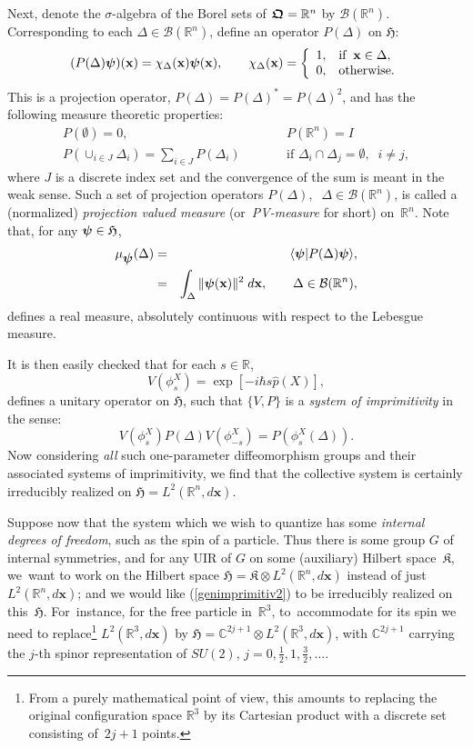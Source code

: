 \documentclass[11pt]{amsart}
\numberwithin{equation}{section}
\theoremstyle{remark}
\newcommand\HH{\mathfrak H}
\newcommand\RR{\mathbb R}
\newcommand{\be}{\begin{equation}}
\newcommand{\en}{\end{equation}}
\newcommand{\bea}{\begin{eqnarray}}
\newcommand{\ena}{\end{eqnarray}}
\newcommand{\CC}{\C}
\newcommand{\bpsi}{\mbox{\boldmath $\psi$}}
\newcommand{\bfrakQ}{\mbox{\boldmath $\mathfrak Q$}}
\newcommand{\bx}{\mathbf x}
\newcommand{\C}{\mathbb C}
\begin{document}
Next, denote the $\sigma$-algebra of the Borel sets of
$\bfrakQ = {\mathbb R}^n$ by ${\mathcal B}({\mathbb R}^n)$. Corresponding
to each $\Delta \in {\mathcal B}({\mathbb R}^n)$, define an operator
$P(\Delta )$ on $\HH$:
\be
  (P(\Delta )\bpsi )(\bx ) = \chi_{\Delta} (\bx )\bpsi (\bx ), \qquad
  \chi_{\Delta} (\bx ) = \left\{ \begin{array}{ll} 1, & \mbox{\rm if} \;\;
  \bx \in \Delta,\\
  0, & \mbox{\rm otherwise.}    \end{array}\right.
\label{PVmeas1}
\en
This is a projection operator, $P(\Delta ) =  P(\Delta )^{*} = P(\Delta )^{2}$,
and has the following measure theoretic properties:
\bea
   P(\emptyset ) = 0 , & \quad & P({\mathbb R}^n) = I \nonumber \\
   P(\cup_{i\in J}\Delta_{i}) = \sum_{i\in J}P(\Delta_{i}) & \qquad &
   \text{if } \Delta_{i}\cap\Delta_{j} = \emptyset, \;\; i\neq j,
\label{PVmeas2}
\ena
where $J$ is a discrete index set and the convergence of the sum is meant in
the weak sense. Such a set of projection operators $P(\Delta ), \;\; \Delta \in
{\mathcal B}({\mathbb R}^n)$, is called a (normalized) {\em projection valued
measure} (or~{\em PV-measure} for short) on~$\RR^n$. Note that, for any
$\bpsi \in \HH$,
\bea
  \mu_{\bpsi}(\Delta) & = & \langle\bpsi\vert P(\Delta )\bpsi\rangle ,
       \nonumber\\
                      & = & \int_{\Delta}\Vert\bpsi (\bx )\Vert^{2}\;d\bx ,
       \qquad  \Delta \in {\mathcal B}({\mathbb R}^n),
\label{realmeas1}
\ena
defines a real measure, absolutely continuous with respect to the Lebesgue
measure.

It is then easily checked that for each $s \in \mathbb R$,
\be
   V(\phi_{s}^{X}) = \exp [-i\hbar s\widehat{p}(X)],
\label{genimprimitiv1}
\en
defines a unitary operator on $\HH$, such that $\{V,P\}$ is a {\em system of
imprimitivity} in the sense:
\be
     V(\phi_{s}^{X})P(\Delta )V(\phi_{-s}^{X})  = P( \phi_{s}^{X}(\Delta )).
\label{genimprimitiv2}
\en
Now considering {\em all} such one-parameter diffeomorphism groups and their
associated systems of imprimitivity, we find that the collective system is
certainly irreducibly realized on $\HH= L^{2}({\mathbb R}^n, d\bx )$.

Suppose now that the system which we wish to quantize has some {\em internal
degrees of freedom}, such as the spin of a particle. Thus there is some group
$G$ of internal symmetries, and for any UIR of $G$ on some (auxiliary) Hilbert
space~$\mathfrak K$, we~want to work on the Hilbert space $\HH=\mathfrak K
\otimes L^2(\RR^n,d\bx)$ instead of just $L^2(\RR^n,d\bx)$; and we would like
(\ref{genimprimitiv2}) to be irreducibly realized on this~$\HH$. For~instance,
for the free particle in~$\RR^3$, to~accommodate for its spin we need to
replace\footnote{From a purely mathematical point of view, this amounts to
replacing the original configuration space $\RR^3$ by its Cartesian product
with a discrete set consisting of~$2j+1$ points.} $L^2(\RR^3,d\bx)$ by
$\HH=\CC^{2j+1}\otimes L^2(\RR^3,d\bx)$, with $\CC^{2j+1}$ carrying the $j$-th
spinor representation of $SU(2)$, $j=0,\frac12,1,\frac32,\dots$.
\end{document}
